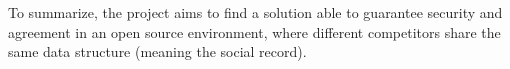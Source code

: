 To summarize, the project aims to find a solution able to guarantee security and agreement in an open source environment, where different competitors share the same data structure (meaning the social record). \par


























